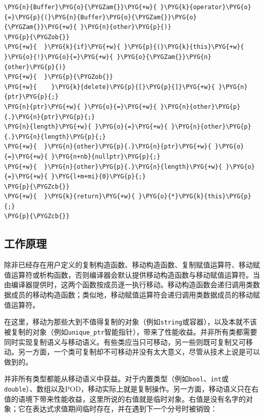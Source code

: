 \begin{codeblockbg}
\begin{Verbatim}[commandchars=\\\{\},breaklines=true,breakanywhere=true,fontsize=\codefont,xleftmargin=17bp]
\PYG{n}{Buffer}\PYG{o}{\PYGZam{}}\PYG{+w}{ }\PYG{k}{operator}\PYG{o}{=}\PYG{p}{(}\PYG{n}{Buffer}\PYG{o}{\PYGZam{}}\PYG{o}{\PYGZam{}}\PYG{+w}{ }\PYG{n}{other}\PYG{p}{)}
\PYG{p}{\PYGZob{}}
\PYG{+w}{  }\PYG{k}{if}\PYG{+w}{ }\PYG{p}{(}\PYG{k}{this}\PYG{+w}{ }\PYG{o}{!}\PYG{o}{=}\PYG{+w}{ }\PYG{o}{\PYGZam{}}\PYG{n}{other}\PYG{p}{)}
\PYG{+w}{  }\PYG{p}{\PYGZob{}}
\PYG{+w}{    }\PYG{k}{delete}\PYG{p}{[}\PYG{p}{]}\PYG{+w}{ }\PYG{n}{ptr}\PYG{p}{;}
\PYG{n}{ptr}\PYG{+w}{ }\PYG{o}{=}\PYG{+w}{ }\PYG{n}{other}\PYG{p}{.}\PYG{n}{ptr}\PYG{p}{;}
\PYG{n}{length}\PYG{+w}{ }\PYG{o}{=}\PYG{+w}{ }\PYG{n}{other}\PYG{p}{.}\PYG{n}{length}\PYG{p}{;}
\PYG{+w}{  }\PYG{n}{other}\PYG{p}{.}\PYG{n}{ptr}\PYG{+w}{ }\PYG{o}{=}\PYG{+w}{ }\PYG{n+nb}{nullptr}\PYG{p}{;}
\PYG{+w}{  }\PYG{n}{other}\PYG{p}{.}\PYG{n}{length}\PYG{+w}{ }\PYG{o}{=}\PYG{+w}{ }\PYG{l+m+mi}{0}\PYG{p}{;}
\PYG{p}{\PYGZcb{}}
\PYG{+w}{  }\PYG{k}{return}\PYG{+w}{ }\PYG{o}{*}\PYG{k}{this}\PYG{p}{;}
\PYG{p}{\PYGZcb{}}
\end{Verbatim}
\end{codeblockbg}



\subsection{工作原理}


除非已经存在用户定义的复制构造函数、移动构造函数、复制赋值运算符、移动赋值运算符或析构函数，否则编译器会默认提供移动构造函数与移动赋值运算符。当由编译器提供时，这两个函数按成员逐一执行移动。移动构造函数会递归调用类数据成员的移动构造函数；类似地，移动赋值运算符会递归调用类数据成员的移动赋值运算符。



在这里，移动为那些大到不值得复制的对象（例如\texttt{string}或容器），以及本就不该被复制的对象（例如\texttt{unique\_\allowbreak{}ptr}智能指针），带来了性能收益。并非所有类都需要同时实现复制语义与移动语义。有些类应当只可移动，另一些则既可复制又可移动。另一方面，一个类可复制却不可移动并没有太大意义，尽管从技术上说是可以做到的。



并非所有类型都能从移动语义中获益。对于内置类型（例如\texttt{bool}、\texttt{int}或\texttt{double}）、数组以及POD，移动实际上就是复制操作。另一方面，移动语义只在右值的语境下带来性能收益，这里所说的右值就是临时对象。右值是没有名字的对象；它在表达式求值期间临时存在，并在遇到下一个分号时被销毁：


